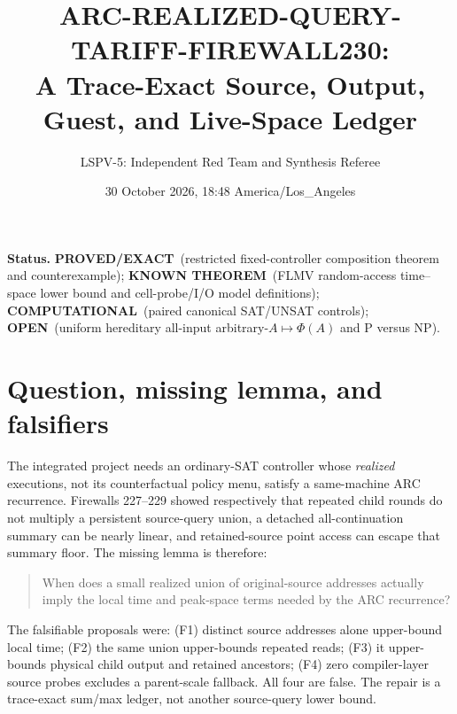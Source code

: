 \documentclass[11pt]{article}
\title{ARC-REALIZED-QUERY-TARIFF-FIREWALL230:\\A Trace-Exact Source, Output, Guest, and Live-Space Ledger}
\author{LSPV-5: Independent Red Team and Synthesis Referee}
\date{30 October 2026, 18:48 America/Los\_Angeles}
\newcommand{\OPEN}{\textbf{OPEN}}
\newcommand{\PROVED}{\textbf{PROVED/EXACT}}
\newcommand{\KNOWN}{\textbf{KNOWN THEOREM}}
\newcommand{\COMP}{\textbf{COMPUTATIONAL}}
\begin{document}
\maketitle

\noindent\textbf{Status.}
\PROVED\ (restricted fixed-controller composition theorem and counterexample);
\KNOWN\ (FLMV random-access time--space lower bound and cell-probe/I/O model definitions);
\COMP\ (paired canonical SAT/UNSAT controls);
\OPEN\ (uniform hereditary all-input arbitrary-$A\mapsto\Phi(A)$ and P versus NP).

\section{Question, missing lemma, and falsifiers}
The integrated project needs an ordinary-SAT controller whose \emph{realized}
executions, not its counterfactual policy menu, satisfy a same-machine ARC
recurrence.  Firewalls 227--229 showed respectively that repeated child rounds
do not multiply a persistent source-query union, a detached all-continuation
summary can be nearly linear, and retained-source point access can escape that
summary floor.  The missing lemma is therefore:

\begin{quote}
When does a small realized union of original-source addresses actually imply
the local time and peak-space terms needed by the ARC recurrence?
\end{quote}

The falsifiable proposals were: (F1) distinct source addresses alone upper-bound
local time; (F2) the same union upper-bounds repeated reads; (F3) it upper-bounds
physical child output and retained ancestors; (F4) zero compiler-layer source
probes excludes a parent-scale fallback.  All four are false.  The repair is a
trace-exact sum/max ledger, not another source-query lower bound.
\end{document}
